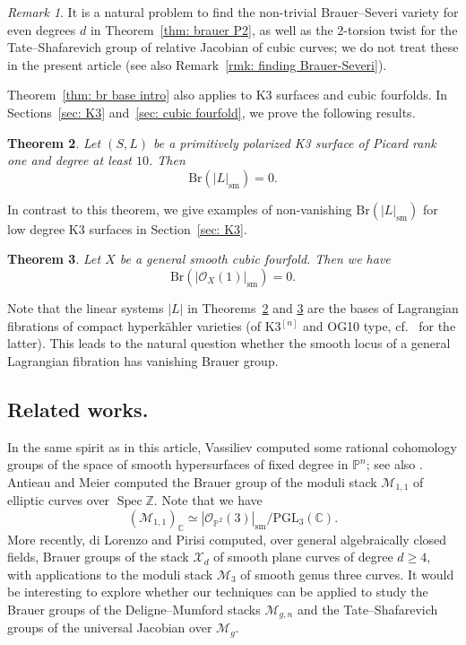 \documentclass[11pt]{amsart}
\theoremstyle{plain}
\newtheorem{thm}{Theorem}[section]
\theoremstyle{definition}
\theoremstyle{remark}
\newtheorem{rmk}[thm]{Remark}
\begin{document}
\begin{rmk}
    It is a natural problem to find the non-trivial Brauer--Severi variety for even degrees $d$ in Theorem~\ref{thm: brauer P2}, as well as the $2$-torsion twist for the Tate--Shafarevich group of  relative Jacobian of cubic curves; we do not treat these in the present article (see also Remark~\ref{rmk: finding Brauer-Severi}). 
\end{rmk}

Theorem~\ref{thm: br base intro} also applies to K3 surfaces and cubic fourfolds. In Sections~\ref{sec: K3} and~\ref{sec: cubic fourfold}, we prove the following results.

\begin{thm}\label{thm: brauer k3}
    Let $(S, L)$ be a primitively polarized K3 surface of Picard rank one and degree at least $10$. Then
    \[
    \mathrm{Br}(|L|_\mathrm{sm}) = 0.
    \]
\end{thm}

In contrast to this theorem, we give examples of non-vanishing $\mathrm{Br}(|L|_\mathrm{sm})$ for low degree K3 surfaces in Section~\ref{sec: K3}. %

\begin{thm}\label{thm: brauer cubic fourfold}
    Let $X$ be a general smooth cubic fourfold. Then we have
    \[
    \mathrm{Br}(|\mathcal{O}_X(1)|_\mathrm{sm}) = 0.
    \]
\end{thm}

Note that the linear systems $|L|$ in Theorems~\ref{thm: brauer k3} and \ref{thm: brauer cubic fourfold} are the bases of Lagrangian fibrations of compact hyperkähler varieties (of K3$^{[n]}$ and OG10 type, cf.~\cite{LSV, Bottini} for the latter). This leads to the natural question whether the smooth locus of a general Lagrangian fibration has vanishing Brauer group.

\subsection{Related works.} In the same spirit as in this article, Vassiliev \cite{Vassiliev} computed some rational cohomology groups of the space of
smooth hypersurfaces of fixed degree in $\mathbb P^n$; see also \cite{Orsola}. Antieau and Meier \cite{AM} computed the Brauer group of the moduli stack $\mathcal{M}_{1,1}$ of elliptic curves over $\operatorname{Spec} \mathbb Z$. Note that we have
\[
(\mathcal{M}_{1,1})_{\mathbb C} \simeq |\mathcal{O}_{\mathbb {P}^2}(3)|_\mathrm{sm} / \mathrm{PGL}_3(\mathbb C).
\]
More recently, di Lorenzo and Pirisi \cite{DiLorenzo-Pirisi} computed, over general algebraically closed fields, Brauer groups of the stack $\mathcal{X}_d$ of smooth plane curves of degree $d\geq 4$, with applications to the moduli stack $\mathcal{M}_3$ of smooth genus three curves. It would be interesting to explore whether our techniques can be applied to study the Brauer groups of the Deligne--Mumford stacks $\mathcal M_{g, n}$ and the Tate--Shafarevich groups of the universal Jacobian over $\mathcal{M}_g$. 
\end{document}
